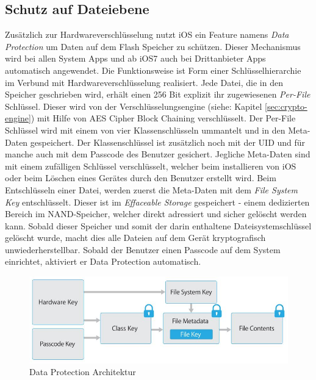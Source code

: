 	\subsection{Schutz auf Dateiebene}
		Zusätzlich zur Hardwareverschlüsselung nutzt iOS ein Feature namens \textsl{Data
		Protection} um Daten auf dem Flash Speicher zu schützen. Dieser Mechanismus
		wird bei allen System Apps und ab iOS7 auch bei Drittanbieter Apps
		automatisch angewendet. Die Funktionsweise ist Form einer Schlüsselhierarchie
		im Verbund mit Hardwareverschlüsselung realisiert. Jede Datei, die in den
		Speicher geschrieben wird, erhält einen 256 Bit explizit ihr zugewiesenen
		\textsl{Per-File} Schlüssel. Dieser wird von der
		Verschlüsselungsengine (siehe: Kapitel \ref{sec:crypto-engine}) mit Hilfe von
		AES Cipher Block Chaining verschlüsselt. Der Per-File Schlüssel wird mit
		einem von vier Klassenschlüsseln ummantelt und in den Meta-Daten gespeichert.
		Der Klassenschlüssel ist zusätzlich noch mit der UID und für manche auch mit
		dem Passcode des Benutzer gesichert. Jegliche Meta-Daten sind mit einem
		zufälligen Schlüssel verschlüsselt, welcher beim installieren von iOS oder
		beim Löschen eines Gerätes durch den Benutzer erstellt wird. Beim
		Entschlüsseln einer Datei, werden zuerst die Meta-Daten mit dem \textsl{File
		System Key} entschlüsselt. Dieser ist im \textsl{Effaceable Storage}
		gespeichert - einem dedizierten Bereich im NAND-Speicher, welcher direkt
		adressiert und sicher gelöscht werden kann.
		Sobald dieser Speicher und somit der darin enthaltene Dateisystemschlüssel
		gelöscht wurde, macht dies alle Dateien auf dem Gerät kryptografisch
		unwiederherstellbar. Sobald der Benutzer einen Passcode auf dem System
		einrichtet, aktiviert er Data Protection automatisch.
		\begin{figure}[h]
			\centering
			\includegraphics[width=0.9\linewidth]{ios/media/data-protection.jpg}
			\caption{Data Protection Architektur 
			\cite[S.10]{iOSSecurityApr2015}}
			\label{fig:data-protection}
		\end{figure}
